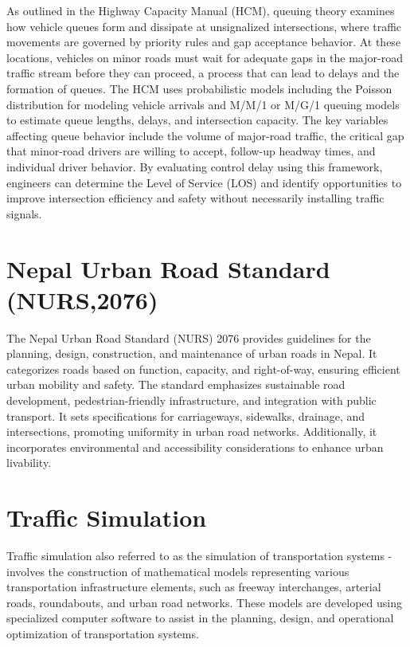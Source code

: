 As outlined in the Highway Capacity Manual (HCM), queuing 
theory examines how vehicle queues form and dissipate at 
unsignalized intersections, where traffic movements are 
governed by priority rules and gap acceptance behavior. At 
these locations, vehicles on minor roads must wait for 
adequate gaps in the major-road traffic stream before they 
can proceed, a process that can lead to delays and the 
formation of queues. The HCM uses probabilistic models
including the Poisson distribution for modeling vehicle 
arrivals and M/M/1 or M/G/1 queuing models to estimate 
queue lengths, delays, and intersection capacity. The key 
variables affecting queue behavior include the volume of 
major-road traffic, the critical gap that minor-road drivers 
are willing to accept, follow-up headway times, and individual 
driver behavior. By evaluating control delay using this 
framework, engineers can determine the Level of Service (LOS) 
and identify opportunities to improve intersection efficiency 
and safety without necessarily installing traffic signals.

\section{Nepal Urban Road Standard (NURS,2076)}

The Nepal Urban Road Standard (NURS) 2076 provides 
guidelines for the planning, design, construction, and 
maintenance of urban roads in Nepal. It categorizes roads 
based on function, capacity, and right-of-way, ensuring 
efficient urban mobility and safety. The standard emphasizes 
sustainable road development, pedestrian-friendly 
infrastructure, and integration with public transport. It 
sets specifications for carriageways, sidewalks, drainage, 
and intersections, promoting uniformity in urban road 
networks. Additionally, it incorporates environmental and 
accessibility considerations to enhance urban livability.

\section{Traffic Simulation}

Traffic simulation also referred to as the simulation of transportation systems - involves the construction of mathematical models representing various transportation infrastructure elements, such as freeway interchanges, arterial roads, roundabouts, and urban road networks. These models are developed using specialized computer software to assist in the planning, design, and operational optimization of transportation systems.


